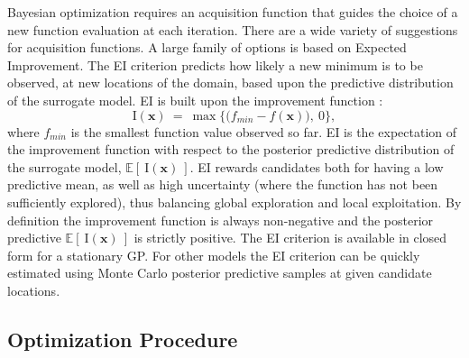 \documentclass{article}
\def \Eix {
        \mathbb{E}\left[~\text{I}(\bm{x})~\right]
}
\def \ix {
        \text{I}(\bm{x})
}
\begin{document}
Bayesian optimization requires an acquisition function that guides the
choice of a new function evaluation at each iteration. There are a
wide variety of suggestions for acquisition functions. A large family
of options is based on Expected Improvement. 
The EI criterion predicts how likely a new minimum is to be observed, at new 
locations of the domain, based upon the predictive distribution of the 
surrogate model.  EI is built upon the improvement function \citep{jonesEIOpt}:
%
\begin{equation}
\ix~=~ \max \Big\{ \big(f_{min} - f(\bm{x})\big), ~0 \Big\},
\label{ix}
\end{equation}
%
where $f_{min}$ is the smallest function value observed so far. EI is the 
expectation of the improvement function with respect to the posterior 
predictive distribution of the surrogate model, $\Eix$. EI rewards candidates 
both for having a low predictive mean, as well as high uncertainty (where the 
function has not been sufficiently explored), thus balancing
global exploration and local exploitation. By definition the improvement 
function is always non-negative and the posterior predictive $\Eix$ is 
strictly positive. The EI criterion is available in closed form for a 
stationary GP. For other models the EI criterion can be quickly estimated using 
Monte Carlo posterior predictive samples at given candidate locations. 

%
%
\subsection{Optimization Procedure}
%
%
\end{document}
